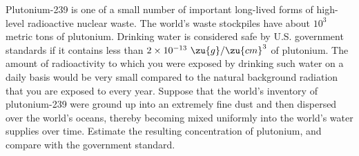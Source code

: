 Plutonium-239 is one of a small number of important long-lived forms of high-level
radioactive nuclear waste. The world's waste stockpiles have about $10^3$ metric tons
of plutonium. Drinking water is considered safe by U.S. government standards if it
contains less than $2\times10^{-13}\ \zu{g}/\zu{cm}^3$ of plutonium.
The amount of radioactivity to which you were exposed by drinking such water
on a daily basis would be very small compared to  the natural background radiation that you are
exposed to every year. Suppose that the world's inventory of plutonium-239 were ground
up into an extremely fine dust and then dispersed over the world's oceans, thereby
becoming mixed uniformly into the world's water supplies over time.
Estimate the resulting concentration of plutonium, and compare with the government standard.

